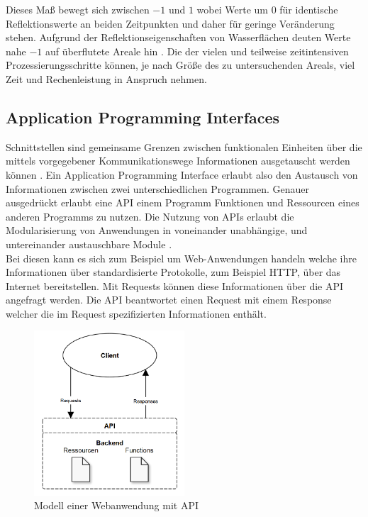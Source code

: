 Dieses Maß bewegt sich zwischen $-1$ und $1$ wobei Werte um $0$ für identische Reflektionswerte an beiden Zeitpunkten und daher für geringe Veränderung stehen. 
Aufgrund der Reflektionseigenschaften von Wasserflächen deuten Werte nahe $-1$ auf überflutete Areale hin \cite{flood_proxy_mapping_ndsi}. 
Die der vielen und teilweise zeitintensiven Prozessierungsschritte können, je nach Größe des zu untersuchenden Areals, viel Zeit und Rechenleistung in Anspruch nehmen.

\subsection{Application Programming Interfaces}
Schnittstellen sind gemeinsame Grenzen zwischen funktionalen Einheiten über die mittels vorgegebener Kommunikationswege Informationen ausgetauscht werden können \cite{geospatial_apis}.
Ein Application Programming Interface erlaubt also den Austausch von Informationen zwischen zwei unterschiedlichen Programmen. 
Genauer ausgedrückt erlaubt eine API einem Programm Funktionen und Ressourcen eines anderen Programms zu nutzen. 
Die Nutzung von APIs erlaubt die Modularisierung von Anwendungen in voneinander unabhängige, und untereinander austauschbare Module \cite{geospatial_apis}.\\

Bei diesen kann es sich zum Beispiel um Web-Anwendungen handeln welche ihre Informationen über standardisierte Protokolle, zum Beispiel HTTP, über das Internet bereitstellen. 
Mit Requests können diese Informationen über die API angefragt werden. 
Die API beantwortet einen Request mit einem Response welcher die im Request spezifizierten Informationen enthält.\\ 

\begin{figure}[H]
    \centering
    \includegraphics[width=0.5\textwidth]{Bilder/api.png}
    \caption{Modell einer Webanwendung mit API}
    \label{api_model}
\end{figure}

